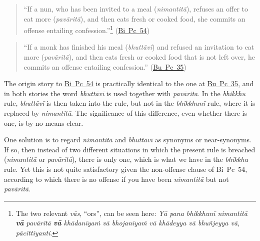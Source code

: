 \documentclass[12pt,openany]{book}%
\begin{document}
\begin{quotation}%
“If a nun, who has been invited to a meal (\textit{\textsanskrit{nimantitā}}), refuses an offer to eat more (\textit{\textsanskrit{pavāritā}}), and then eats fresh or cooked food, she commits an offense entailing confession.”\footnote{The two relevant \textit{\textsanskrit{vās}}, “ors”, can be seen here: \textit{\textsanskrit{Yā} pana \textsanskrit{bhikkhunī} \textsanskrit{nimantitā} \textbf{\textsanskrit{vā}} \textsanskrit{pavāritā} \textbf{\textsanskrit{vā}} \textsanskrit{khādanīyaṁ} \textsanskrit{vā} \textsanskrit{bhojanīyaṁ} \textsanskrit{vā} \textsanskrit{khādeyya} \textsanskrit{vā} \textsanskrit{bhuñjeyya} \textsanskrit{vā}, \textsanskrit{pācittiyanti}}. } (\href{https://suttacentral.net/pli-tv-bi-vb-pc54/en/brahmali\#1.20.1}{Bi~Pc~54})

%
\end{quotation}

\begin{quotation}%
“If a monk has finished his meal (\textit{\textsanskrit{bhuttāvī}}) and refused an invitation to eat more (\textit{\textsanskrit{pavāritā}}), and then eats fresh or cooked food that is not left over, he commits an offense entailing confession.” (\href{https://suttacentral.net/pli-tv-bu-vb-pc35/en/brahmali\#2.15.1}{Bu~Pc~35})

%
\end{quotation}

The origin story to \href{https://suttacentral.net/pli-tv-bi-vb-pc54/en/brahmali\#1.1}{Bi~Pc~54} is practically identical to the one at \href{https://suttacentral.net/pli-tv-bu-vb-pc35/en/brahmali\#1.1}{Bu~Pc~35}, and in both stories the word \textit{\textsanskrit{bhuttāvī}} is used together with \textit{\textsanskrit{pavārita}}. In the \textit{bhikkhu} rule, \textit{\textsanskrit{bhuttāvī}} is then taken into the rule, but not in the \textit{\textsanskrit{bhikkhunī}} rule, where it is replaced by \textit{\textsanskrit{nimantitā}}. The significance of this difference, even whether there is one, is by no means clear.

One solution is to regard \textit{\textsanskrit{nimantitā}} and \textit{\textsanskrit{bhuttāvī}} as synonyms or near-synonyms. If so, then instead of two different situations in which the present rule is breached (\textit{\textsanskrit{nimantitā}} or \textit{\textsanskrit{pavāritā}}), there is only one, which is what we have in the \textit{bhikkhu} rule. Yet this is not quite satisfactory given the non-offense clause of Bi Pc 54, according to which there is no offense if you have been \textit{\textsanskrit{nimantitā}} but not \textit{\textsanskrit{pavāritā}}.
\end{document}
